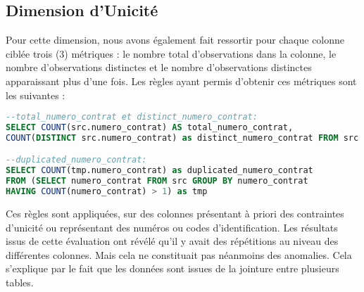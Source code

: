 \subsection{Dimension d'Unicit\'e}
Pour cette dimension, nous avons \'egalement fait ressortir pour chaque colonne cibl\'ee trois (3) m\'etriques :  le nombre total d'observations dans la colonne, le nombre d'observations distinctes et le nombre d'observations distinctes apparaissant plus d'une fois. Les r\`egles ayant permis d'obtenir ces m\'etriques sont les suivantes : 
\begin{lstlisting}[language=SQL,caption={R\`egles de la Dimension Unicit\'e},captionpos=b,showspaces=false,basicstyle=\scriptsize,numbers=none,commentstyle=\color{gray},backgroundcolor=\color{background}]
--total_numero_contrat et distinct_numero_contrat: 
SELECT COUNT(src.numero_contrat) AS total_numero_contrat, 
COUNT(DISTINCT src.numero_contrat) as distinct_numero_contrat FROM src 

--duplicated_numero_contrat: 
SELECT COUNT(tmp.numero_contrat) as duplicated_numero_contrat 
FROM (SELECT numero_contrat FROM src GROUP BY numero_contrat 
HAVING COUNT(numero_contrat) > 1) as tmp
\end{lstlisting}
Ces r\`egles sont appliqu\'ees, sur des colonnes pr\'esentant \`a priori des contraintes d'unicit\'e ou repr\'esentant des num\'eros ou codes d'identification. Les r\'esultats issus de cette \'evaluation ont r\'ev\'el\'e qu'il y avait des r\'ep\'etitions au niveau des diff\'erentes colonnes. Mais cela ne constituait pas n\'eanmoins des anomalies. Cela s'explique par le fait que les donn\'ees sont issues de la jointure entre plusieurs tables.


